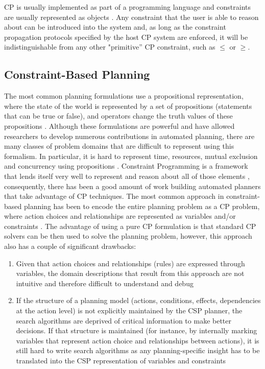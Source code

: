 \textsf{CP} is usually implemented as part of a programming language
and constraints are usually represented as objects \cite{puget95}. Any
constraint that the user is able to reason about can be introduced
into the system and, as long as the constraint propagation protocols
specified by the host \textsf{CP} system are enforced, it will be
indistinguishable from any other "primitive'' \textsf{CP} constraint,
such as $\leq$ or $\geq$.

\subsection{Constraint-Based Planning}
\label{sec:europa:cp}

The most common planning formulations use a propositional
representation, where the state of the world is represented by a set
of propositions (statements that can be true or false), and operators
change the truth values of these propositions \cite{gen87}. Although
these formulations are powerful and have allowed researchers to
develop numerous contributions in automated planning, there are many
classes of problem domains that are difficult to represent using this
formalism. In particular, it is hard to represent time, resources,
mutual exclusion and concurrency using propositions . 
Constraint Programming is a framework that lends itself very well to represent and reason about all of those elements ,
consequently, there has been a good amount of work building automated planners that take advantage of CP techniques.
The most common approach in constraint-based planning has been to encode the entire planning problem as a CP problem, 
where action choices and relationships are represented as variables and/or constraints .
The advantage of using a pure CP formulation is that standard CP solvers can be then used to solve the planning problem, however, this approach also has a couple of significant drawbacks:

\begin{enumerate} 

\item Given that action choices and relationships (rules) are expressed
  through variables, the domain descriptions that result from this
  approach are not intuitive and therefore difficult to understand and
  debug

\item If the structure of a planning model (actions, conditions,
  effects, dependencies at the action level) is not explicitly
  maintained by the CSP planner, the search algorithms are deprived of
  critical information to make better decisions. If that structure is
  maintained (for instance, by internally marking variables that
  represent action choice and relationships between actions), it is
  still hard to write search algorithms as any planning-specific
  insight has to be translated into the CSP representation of
  variables and constraints 

\end{enumerate}


